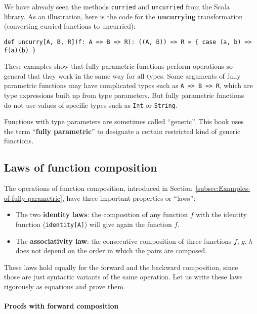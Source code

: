 We have already seen the methods \lstinline!curried! and \lstinline!uncurried!
from the Scala library. As an illustration, here is the code for the
\textbf{uncurrying} transformation (converting
curried functions to uncurried):
\begin{lstlisting}
def uncurry[A, B, R](f: A => B => R): ((A, B)) => R = { case (a, b) => f(a)(b) }
\end{lstlisting}

These examples show that fully parametric functions perform operations
so general that they work in the same way for all types. Some arguments
of fully parametric functions may have complicated types such as \lstinline!A => B => R!,
which are type expressions built up from type parameters. But fully
parametric functions do not use values of specific types such as \lstinline!Int!
or \lstinline!String!.

Functions with type parameters are sometimes called \textsf{``}generic\textsf{''}.
This book uses the term \textsf{``}\textbf{fully
parametric}\textsf{''} to designate a certain restricted kind of generic functions.

\subsection{Laws of function composition\label{subsec:Laws-of-function-composition}}

The operations of function composition, introduced in Section~\ref{subsec:Examples-of-fully-parametric},
have three important properties or \textsf{``}laws\textsf{''}:
\begin{itemize}
\item The two \textbf{identity laws}:
the composition of any function $f$ with the identity function (\lstinline!identity[A]!)
will give again the function $f$.
\item The \textbf{associativity law}:
the consecutive composition of three functions $f$, $g$, $h$ does
not depend on the order in which the pairs are composed.
\end{itemize}
These laws hold equally for the forward and the backward composition,
since those are just syntactic variants of the same operation. Let
us write these laws rigorously as equations and prove them.

\paragraph{Proofs with forward composition}

